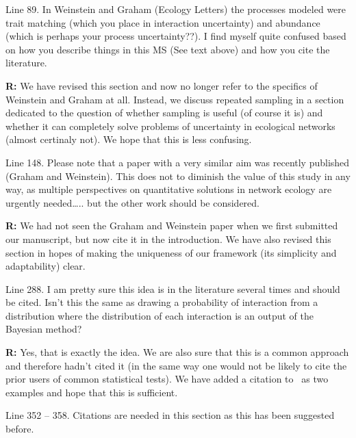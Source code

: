 \documentclass[12pt]{letter}
\newenvironment{refquote}{\bigskip \begin{it}}{\end{it}\smallskip}
\begin{document}
		\begin{refquote}
		Line 89.  In Weinstein and Graham (Ecology Letters) the processes modeled were trait matching (which you place in interaction uncertainty) and abundance (which is perhaps your process uncertainty??).  I find myself quite confused based on how you describe things in this MS (See text above) and how you cite the literature.
		\end{refquote}

		\textbf{R:} We have revised this section and now no longer refer to the specifics of Weinstein and Graham at all. Instead, we discuss repeated sampling in a section dedicated to the question of whether sampling is useful (of course it is) and whether it can completely solve problems of uncertainty in ecological networks (almost certinaly not). We hope that this is less confusing.

		\begin{refquote}
		Line 148.  Please note that a paper with a very similar aim was recently published (Graham and Weinstein).  This does not to diminish the value of this study in any way, as multiple perspectives on quantitative solutions in network ecology are urgently needed….. but the other work should be considered. 
		\end{refquote}

		\textbf{R:} We had not seen the Graham and Weinstein paper when we first submitted our manuscript, but now cite it in the introduction. We have also revised this section in hopes of making the uniqueness of our framework (its simplicity and adaptability) clear. 

		\begin{refquote}
		Line 288.  I am pretty sure this idea is in the literature several times and should be cited.  Isn’t this the same as drawing a probability of interaction from a distribution where the distribution of each interaction is an output of the Bayesian method?\\
		\end{refquote}

		\textbf{R:} Yes, that is exactly the idea. We are also sure that this is a common approach and therefore hadn't cited it (in the same way one would not be likely to cite the prior users of common statistical tests). We have added a citation to~\citet{Vazquez2005,Guimera2009} as two examples and hope that this is sufficient.

		\begin{refquote}
		Line 352 – 358.  Citations are needed in this section as this has been suggested before.
		\end{refquote}
\end{document}
